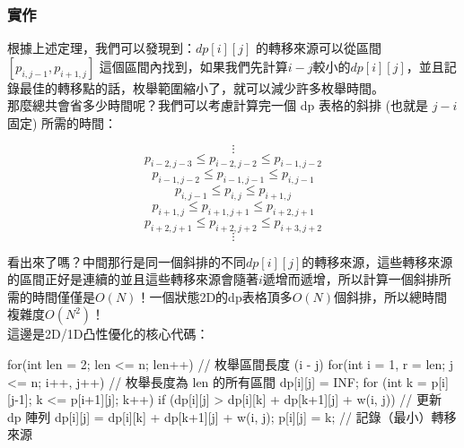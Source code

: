 	\subsubsection{實作}
	
	根據上述定理，我們可以發現到：$dp[i][j]$ 的轉移來源可以從區間 $[p_{i,j−1}, p_{i+1,j} ]$ 這個區間內找到，如果我們先計算$i-j$較小的$dp[i][j]$，並且記錄最佳的轉移點的話，枚舉範圍縮小了，就可以減少許多枚舉時間。\\
	
	那麼總共會省多少時間呢？我們可以考慮計算完一個 dp 表格的斜排 (也就是 $j - i$ 固定) 所需的時間：
	
	\begin{displaymath}
	\vdots
	\end{displaymath}
	\begin{displaymath}
	p_{i−2,j−3} \leq p_{i−2,j−2} \leq p_{i−1,j−2}
	\end{displaymath}
	\begin{displaymath}
	p_{i−1,j−2} \leq p_{i−1,j−1} \leq p_{i,j−1}
	\end{displaymath}
	\begin{displaymath}
	p_{i,j−1} \leq p_{i,j} \leq p_{i+1,j}
	\end{displaymath}
	\begin{displaymath}
	p_{i+1,j} \leq p_{i+1,j+1} \leq p_{i+2,j+1}
	\end{displaymath}
	\begin{displaymath}
	p_{i+2,j+1} \leq p_{i+2,j+2} \leq p_{i+3,j+2}
	\end{displaymath}
	\begin{displaymath}
	\vdots
	\end{displaymath}
	
	看出來了嗎？中間那行是同一個斜排的不同$dp[i][j]$的轉移來源，這些轉移來源的區間正好是連續的並且這些轉移來源會隨著$i$遞增而遞增，所以計算一個斜排所需的時間僅僅是$O(N)$！一個狀態2D的dp表格頂多$O(N)$個斜排，所以總時間複雜度$O(N^2)$！\\
	
	這邊是2D/1D凸性優化的核心代碼：\\
	
	\begin{C++}
		for(int len = 2; len <= n; len++){  // 枚舉區間長度 (i - j)
			for(int i = 1, r = len; j <= n; i++, j++){
				// 枚舉長度為 len 的所有區間
				dp[i][j] = INF;
				for (int k = p[i][j-1]; k <= p[i+1][j]; k++)
				if (dp[i][j] > dp[i][k] + dp[k+1][j] + w(i, j)){
					// 更新 dp 陣列
					dp[i][j] = dp[i][k] + dp[k+1][j] + w(i, j);
					p[i][j] = k;  // 記錄（最小）轉移來源
				}
			}
		}
	\end{C++}
	
